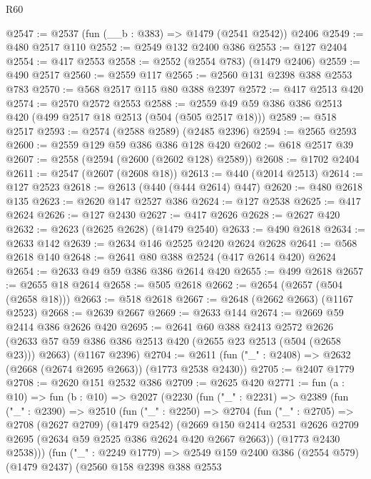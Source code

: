 \begin{lexlean}{R60}
\begin{coremodule}
@2547 := @2537 (fun (__b : @383) => @1479 (@2541 @2542)) @2406
@2549 := @480 @2517 @110
@2552 := @2549 @132 @2400 @386
@2553 := @127 @2404
@2554 := @417 @2553
@2558 := @2552 (@2554 @783) (@1479 @2406)
@2559 := @490 @2517
@2560 := @2559 @117
@2565 := @2560 @131 @2398 @388 @2553 @783
@2570 := @568 @2517 @115 @80 @388 @2397
@2572 := @417 @2513 @420
@2574 := @2570 @2572 @2553
@2588 := @2559 @49 @59 @386 @386 @2513 @420 (@499 @2517 @18 @2513 (@504 (@505 @2517 @18)))
@2589 := @518 @2517
@2593 := @2574 (@2588 @2589) (@2485 @2396)
@2594 := @2565 @2593
@2600 := @2559 @129 @59 @386 @386 @128 @420
@2602 := @618 @2517 @39
@2607 := @2558 (@2594 (@2600 (@2602 @128) @2589))
@2608 := @1702 @2404
@2611 := @2547 (@2607 (@2608 @18))
@2613 := @440 (@2014 @2513)
@2614 := @127 @2523
@2618 := @2613 (@440 (@444 @2614) @447)
@2620 := @480 @2618 @135
@2623 := @2620 @147 @2527 @386
@2624 := @127 @2538
@2625 := @417 @2624
@2626 := @127 @2430
@2627 := @417 @2626
@2628 := @2627 @420
@2632 := @2623 (@2625 @2628) (@1479 @2540)
@2633 := @490 @2618
@2634 := @2633 @142
@2639 := @2634 @146 @2525 @2420 @2624 @2628
@2641 := @568 @2618 @140
@2648 := @2641 @80 @388 @2524 (@417 @2614 @420) @2624
@2654 := @2633 @49 @59 @386 @386 @2614 @420
@2655 := @499 @2618
@2657 := @2655 @18 @2614
@2658 := @505 @2618
@2662 := @2654 (@2657 (@504 (@2658 @18)))
@2663 := @518 @2618
@2667 := @2648 (@2662 @2663) (@1167 @2523)
@2668 := @2639 @2667
@2669 := @2633 @144
@2674 := @2669 @59 @2414 @386 @2626 @420
@2695 := @2641
    @60
    @388
    @2413
    @2572
    @2626
    (@2633 @57 @59 @386 @386 @2513 @420 (@2655 @23 @2513 (@504 (@2658 @23))) @2663)
    (@1167 @2396)
@2704 := @2611 (fun ("_" : @2408) => @2632 (@2668 (@2674 @2695 @2663)) (@1773 @2538 @2430))
@2705 := @2407 @1779
@2708 := @2620 @151 @2532 @386
@2709 := @2625 @420
@2771 := fun (a : @10) =>
  fun (b : @10) =>
  @2027
    (@2230
      (fun ("_" : @2231) =>
      @2389
        (fun ("_" : @2390) =>
        @2510
          (fun ("_" : @2250) =>
          @2704
            (fun ("_" : @2705) =>
            @2708
              (@2627 @2709)
              (@1479 @2542)
              (@2669
                @150
                @2414
                @2531
                @2626
                @2709
                @2695
                (@2634 @59 @2525 @386 @2624 @420 @2667 @2663))
              (@1773 @2430 @2538)))
          (fun ("_" : @2249 @1779) =>
          @2549
            @159
            @2400
            @386
            (@2554 @579)
            (@1479 @2437)
            (@2560
              @158
              @2398
              @388
              @2553

\end{coremodule}
\end{lexlean}
